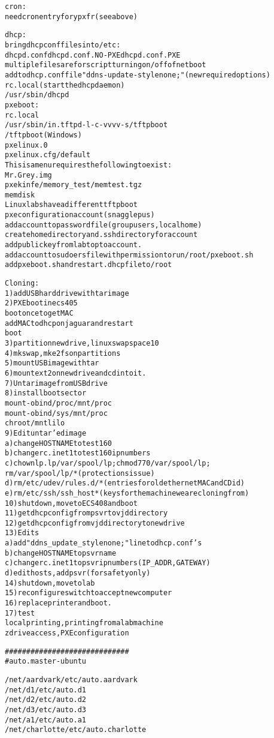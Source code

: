 \begin{alltt}
cron:
  need cron entry for ypxfr (see above)

dhcp:
  bring dhcp conf files into /etc:
    dhcpd.conf dhcpd.conf.NO-PXE dhcpd.conf.PXE
     multiple files are for script turning on/off of netboot
   add to dhcp.conf file "ddns-update-style none;" (new required options)
  rc.local (start the dhcp daemon)
   /usr/sbin/dhcpd
pxe boot:
  rc.local
   /usr/sbin/in.tftpd -l -c -vvvv -s /tftpboot
  /tftpboot (Windows)
    pxelinux.0
    pxelinux.cfg/default
      This is a menu requires the following to exist:
       Mr.Grey.img
       pxekinfe/memory_test/memtest.tgz
       memdisk
    Linux labs have a different tftpboot
  pxe configuration account (snagglepus)
   add account to password file (group users, local home)
   create home directory and .ssh directory for account
   add public key from lab top to account.
   add account to sudoers file with permission to run /root/pxeboot.sh
   add pxeboot.sh and restart.dhcp file to /root


Cloning:
  1) add USB hard drive with tar image
  2) PXE boot in ecs 405 
    boot once to get MAC
    add MAC to dhcp on jaguar and restart
    boot
  3) partition new drive, linux swap space 10%, linux ext2 90%
  4) mkswap, mke2fs on partitions
  5) mount USB image with tar
  6) mount ext2 on new drive and cd into it.
  7) Untar image from USB drive
  8) install boot sector
     mount -o bind /proc /mnt/proc
     mount -o bind /sys /mnt/proc
     chroot /mnt lilo
  9) Edit untar'ed image
     a) change HOSTNAME to test160
     b) change rc.inet1 to test160 ip numbers
     c) chown lp.lp /var/spool/lp; chmod 770 /var/spool/lp ;
        rm /var/spool/lp/* (protections issue)
     d) rm /etc/udev/rules.d/*  (entries for old ethernet MAC and CD id)
     e) rm /etc/ssh/ssh_host*   (keys for the machine we are cloning from)
  10) shutdown, move to ECS 408 and boot
  11) get dhcp config from psvr to vjd directory
  12) get dhcp config from vjd directory to new drive
  13) Edits
     a) add "ddns_update_style none;" line to dhcp.conf's
     b) change HOSTNAME to psvr name
     c) change rc.inet1 to psvr ip numbers (IP_ADDR, GATEWAY)
     d) edit hosts, add psvr (for safety only)
  14) shutdown, move to lab
  15) reconfigure switch to accept new computer
  16) replace printer and boot.
  17) test
    local printing, printing from a lab machine
    z drive access, PXE configuration

#############################
#auto.master - ubuntu

/net/aardvark /etc/auto.aardvark
/net/d1 /etc/auto.d1
/net/d2 /etc/auto.d2
/net/d3 /etc/auto.d3
/net/a1 /etc/auto.a1
/net/charlotte /etc/auto.charlotte


\end{alltt}
